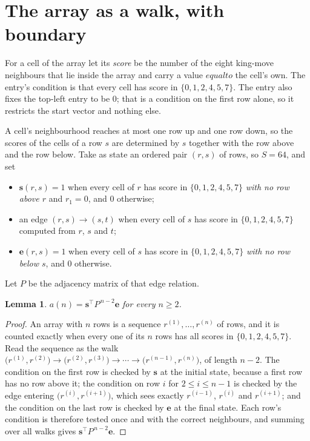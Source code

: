 \documentclass[11pt,a4paper]{article}
\theoremstyle{plain}
\newtheorem{lemma}[theorem]{Lemma}
\theoremstyle{definition}
\begin{document}
\section{The array as a walk, with boundary}

For a cell of the array let its \emph{score} be the number of the eight king-move neighbours that lie inside
the array and carry a value $equal to$ the cell's own. The entry's condition is that every cell
has score in $\{0,1,2,4,5,7\}$. The entry also fixes the top-left entry to be $0$; that is a condition on the first row alone, so it restricts the start vector and nothing else.

A cell's neighbourhood reaches at most one row up and one row down, so the scores of the
cells of a row $s$ are determined by $s$ together with the row above and the row below.
Take as state an ordered pair $(r,s)$ of rows, so $S=64$, and set
\begin{itemize}
\item $\mathbf{s}(r,s)=1$ when every cell of $r$ has score in $\{0,1,2,4,5,7\}$ \emph{with no row
above $r$} and $r_1=0$, and $0$ otherwise;
\item an edge $(r,s)\to(s,t)$ when every cell of $s$ has score in $\{0,1,2,4,5,7\}$ computed from
$r$, $s$ and $t$;
\item $\mathbf{e}(r,s)=1$ when every cell of $s$ has score in $\{0,1,2,4,5,7\}$ \emph{with no row
below $s$}, and $0$ otherwise.
\end{itemize}
Let $P$ be the adjacency matrix of that edge relation.

\begin{lemma}\label{lem:walk}
$a(n)=\mathbf{s}^{\!\top}P^{\,n-2}\mathbf{e}$ for every $n\ge2$.
\end{lemma}

\begin{proof}
An array with $n$ rows is a sequence $r^{(1)},\dots,r^{(n)}$ of rows, and it is counted
exactly when every one of its $n$ rows has all scores in $\{0,1,2,4,5,7\}$. Read the sequence as the
walk $\bigl(r^{(1)},r^{(2)}\bigr)\to\bigl(r^{(2)},r^{(3)}\bigr)\to\cdots\to
\bigl(r^{(n-1)},r^{(n)}\bigr)$, of length $n-2$. The condition on the first row is
checked by $\mathbf{s}$ at the initial state, because a first row has no row above it; the
condition on row $i$ for $2\le i\le n-1$ is checked by the edge entering
$\bigl(r^{(i)},r^{(i+1)}\bigr)$, which sees exactly $r^{(i-1)}$, $r^{(i)}$ and
$r^{(i+1)}$; and the condition on the last row is checked by $\mathbf{e}$ at the final
state. Each row's condition is therefore tested once and with the correct neighbours, and
summing over all walks gives $\mathbf{s}^{\!\top}P^{\,n-2}\mathbf{e}$.
\end{proof}
\end{document}
